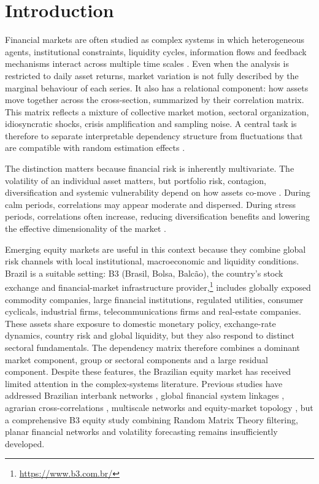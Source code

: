 \section{Introduction}
\label{sec:introduction}

Financial markets are often studied as complex systems in which heterogeneous agents, institutional constraints, liquidity cycles, information flows and feedback mechanisms interact across multiple time scales \cite{mantegna_stanley_1999_book,cont_2001_empirical}. Even when the analysis is restricted to daily asset returns, market variation is not fully described by the marginal behaviour of each series. It also has a relational component: how assets move together across the cross-section, summarized by their correlation matrix. This matrix reflects a mixture of collective market motion, sectoral organization, idiosyncratic shocks, crisis amplification and sampling noise. A central task is therefore to separate interpretable dependency structure from fluctuations that are compatible with random estimation effects \cite{raddant_dimatteo_2023}.

The distinction matters because financial risk is inherently multivariate. The volatility of an individual asset matters, but portfolio risk, contagion, diversification and systemic vulnerability depend on how assets co-move \cite{billio_2012_econometric}. During calm periods, correlations may appear moderate and dispersed. During stress periods, correlations often increase, reducing diversification benefits and lowering the effective dimensionality of the market \cite{junior_2012_correlation,zheng_2012_changes}.

Emerging equity markets are useful in this context because they combine global risk channels with local institutional, macroeconomic and liquidity conditions. Brazil is a suitable setting: B3 (Brasil, Bolsa, Balc\~ao), the country's stock exchange and financial-market infrastructure provider,\footnote{\url{https://www.b3.com.br/}} includes globally exposed commodity companies, large financial institutions, regulated utilities, consumer cyclicals, industrial firms, telecommunications firms and real-estate companies. These assets share exposure to domestic monetary policy, exchange-rate dynamics, country risk and global liquidity, but they also respond to distinct sectoral fundamentals. The dependency matrix therefore combines a dominant market component, group or sectoral components and a large residual component. Despite these features, the Brazilian equity market has received limited attention in the complex-systems literature. Previous studies have addressed Brazilian interbank networks \cite{tabak_2010_topology}, global financial system linkages \cite{silva_2016_structure}, agrarian cross-correlations \cite{stosic_2015_correlations}, multiscale networks \cite{pereira_2019_multiscale} and equity-market topology \cite{leonel_2022_brazilian}, but a comprehensive B3 equity study combining Random Matrix Theory filtering, planar financial networks and volatility forecasting remains insufficiently developed.


